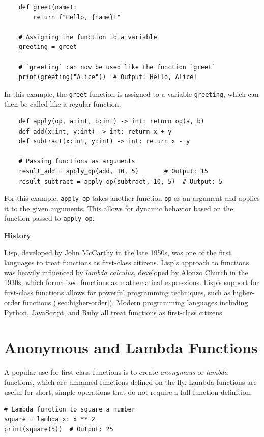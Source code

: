 \documentclass[oneside,11pt,dvipsnames]{book}
\newenvironment{historybox}[1][]{
  \small
  \begin{myhistorybox}
    {\small \textbf{#1}}
  }{
  \end{myhistorybox}
}
\newcommand{\code}[1]{\texttt{#1}}
\begin{document}
\begin{lstlisting}
    def greet(name):
        return f"Hello, {name}!"

    # Assigning the function to a variable
    greeting = greet

    # `greeting` can now be used like the function `greet`
    print(greeting("Alice"))  # Output: Hello, Alice!
\end{lstlisting}

In this example, the \code{greet} function is assigned to a variable \code{greeting}, which can then be called like a regular function. 

\begin{lstlisting}
    def apply(op, a:int, b:int) -> int: return op(a, b)        
    def add(x:int, y:int) -> int: return x + y        
    def subtract(x:int, y:int) -> int: return x - y        

    # Passing functions as arguments
    result_add = apply_op(add, 10, 5)       # Output: 15
    result_subtract = apply_op(subtract, 10, 5)  # Output: 5
\end{lstlisting}

For this example, \code{apply\_op} takes another function \code{op} as an argument and applies it to the given arguments. This allows for dynamic behavior based on the function passed to \code{apply\_op}.

\begin{historybox}[History]
Lisp, developed by John McCarthy in the late 1950s, was one of the first languages to treat functions as first-class citizens. Lisp's approach to functions was heavily influenced by \emph{lambda calculus}, developed by Alonzo Church in the 1930s, which formalized functions as mathematical expressions. Lisp's support for first-class functions allows for powerful programming techniques, such as higher-order functions (\autoref{sec:higher-order}).  Modern programming languages including Python, JavaScript, and Ruby all treat functions as first-class citizens. 
\end{historybox}

\section{Anonymous and Lambda Functions}\label{sec:lambda}
A popular use for first-class functions is to create \emph{anonymous} or \emph{lambda} functions, which are unnamed functions defined on the fly. Lambda functions are useful for short, simple operations that do not require a full function definition. 
\begin{lstlisting}
# Lambda function to square a number
square = lambda x: x ** 2
print(square(5))  # Output: 25
\end{lstlisting}
\end{document}

